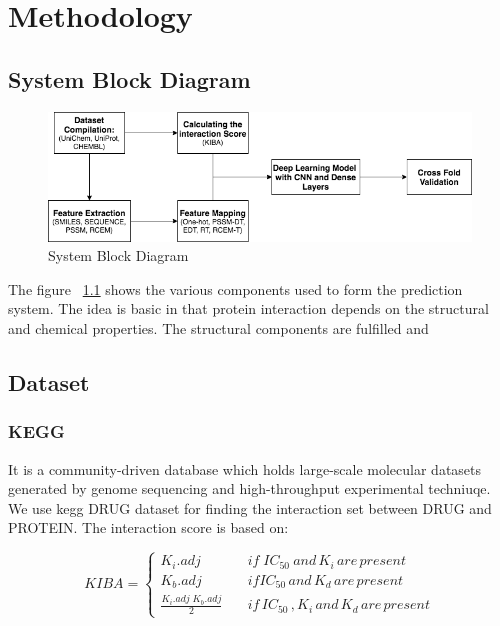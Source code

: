 \chapter{Methodology}

\section{System Block Diagram}

\begin{figure}[ht]
\centering
\includegraphics[width=1\linewidth]{mainmatter/3-Methodology/images/block.png}
\caption{System Block Diagram}
\label{fig:system}
\end{figure}

{The figure }~\ref{fig:system}
{
shows the various components used to form the prediction system. The idea is basic in that protein interaction depends on the structural and chemical properties. The structural components are fulfilled and
}

\section{Dataset}

\subsection{KEGG}
It is a community-driven database which holds large-scale molecular datasets generated by genome sequencing and high-throughput experimental techniuqe.\cite{Kanehisa2000} We use \acrshort{kegg} DRUG dataset for finding the interaction set between DRUG and PROTEIN. The interaction score is based on:

\begin{flushright}
\begin{equation}
  KIBA = \begin{cases}
    K_i . {adj} & \quad {if} \; {IC_{50}\: and\, K_i \,are\, present} \\
    K_b.{adj} & \quad {if}  {IC_{50} \, and \, K_d \, are \, present} \\
    \frac{K_i . {adj} \; K_b.{adj}}{2} & \quad {if\, IC_{50}\,,K_i\, and \,K_d\, are\, present}
  \end{cases}
   \label{eq:kiba}
\end{equation}
\end{flushright}


